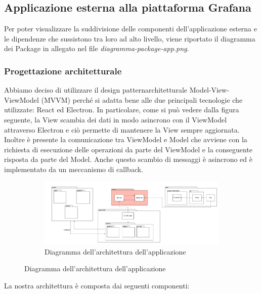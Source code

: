 \subsection{Applicazione esterna alla piattaforma Grafana}
Per poter visualizzare la suddivisione delle componenti dell'applicazione esterna e le dipendenze che sussistono tra loro ad alto livello, viene riportato il diagramma dei Package in allegato nel file \textit{diagramma-package-app.png}.
	\subsubsection{Progettazione architetturale}
	Abbiamo deciso di utilizzare il design pattern\glosp architetturale Model-View-ViewModel (MVVM) perché si adatta bene alle due principali tecnologie che utilizzate: React ed Electron. In particolare, come si può vedere dalla figura seguente, la View scambia dei dati in modo asincrono con il ViewModel attraverso Electron e ciò permette di mantenere la View sempre aggiornata. Inoltre è presente la comunicazione tra ViewModel e Model che avviene con la richiesta di esecuzione delle operazioni da parte del ViewModel e la conseguente risposta da parte del Model. Anche questo scambio di messaggi è asincrono ed è implementato da un meccanismo di callback\glo.
	\mbox{}
	\begin{landscape}
		\begin{figure}
			\begin{figure} [H]
				\includegraphics[width=\linewidth]{./img/Diagrammi/architettura-app.png}
				\caption{Diagramma dell'architettura dell'applicazione}
			\end{figure}
		\end{figure}
	\end{landscape}
	La nostra architettura è composta dai seguenti componenti: 
